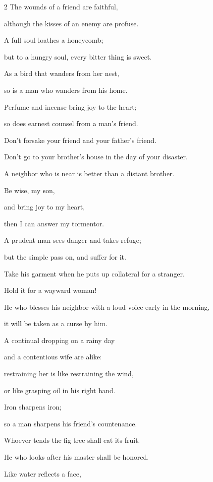 \begin{multicols}{2}
\myverse{}The wounds of a friend are faithful,

although the kisses of an enemy are profuse.


\myverse{}A full soul loathes a honeycomb;

but to a hungry soul, every bitter thing is sweet.


\myverse{}As a bird that wanders from her nest,

so is a man who wanders from his home.


\myverse{}Perfume and incense bring joy to the heart;

so does earnest counsel from a man’s friend.


\myverse{}Don’t forsake your friend and your father’s friend.

Don’t go to your brother’s house in the day of your disaster.

A neighbor who is near is better than a distant brother.


\myverse{}Be wise, my son,

and bring joy to my heart,

then I can answer my tormentor.


\myverse{}A prudent man sees danger and takes refuge;

but the simple pass on, and suffer for it.


\myverse{}Take his garment when he puts up collateral for a stranger.

Hold it for a wayward woman!


\myverse{}He who blesses his neighbor with a loud voice early in the
morning,

it will be taken as a curse by him.


\myverse{}A continual dropping on a rainy day

and a contentious wife are alike:


\myverse{}restraining her is like restraining the wind,

or like grasping oil in his right hand.


\vspace{\baselineskip} 
\myverse{}Iron sharpens iron;

so a man sharpens his friend’s countenance.


\myverse{}Whoever tends the fig tree shall eat its fruit.

He who looks after his master shall be honored.


\myverse{}Like water reflects a face,


\end{multicols}
